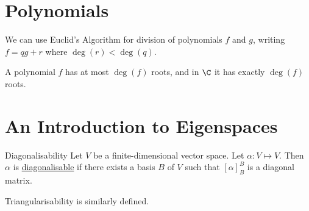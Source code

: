 \documentclass[../Main.tex]{subfiles}
\begin{document}
\section{Polynomials}
We can use Euclid's Algorithm for division of polynomials $f$ and $g$, writing $f = qg + r$ where $\deg(r) < \deg(q)$.

A polynomial $f$ has at most $\deg(f)$ roots, and in $\C$ it has exactly $\deg(f)$ roots.
\section{An Introduction to Eigenspaces}
\begin{definition}{Diagonalisability}
    Let $V$ be a finite-dimensional vector space. Let $\alpha : V \mapsto V$. Then $\alpha$ is \underline{diagonalisable} if there exists a basis $B$ of $V$ such that $[\alpha]_B^B$ is a diagonal matrix.
\end{definition}
Triangularisability is similarly defined.
\end{document}
